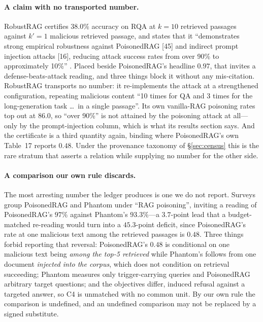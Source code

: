 \documentclass[11pt]{article}
\begin{document}
\paragraph{A claim with no transported number.}
RobustRAG certifies $38.0\%$ accuracy on RQA at $k=10$ retrieved passages
against $k'=1$ malicious retrieved passage, and states that it ``demonstrates
strong empirical robustness against PoisonedRAG [45] and indirect prompt
injection attacks [16], reducing attack success rates from over 90\% to
approximately 10\%'' \citep{certifiedRAG2024}. Placed beside PoisonedRAG's
headline $0.97$, that invites a defense-beats-attack reading, and three things
block it without any mis-citation. RobustRAG transports no number: it
re-implements the attack at a strengthened configuration, repeating malicious
content ``10 times for QA and 3 times for the long-generation task \dots\ in a
single passage''. Its own vanilla-RAG poisoning rates top out at $86.0$, so
``over 90\%'' is not attained by the poisoning attack at all---only by the
prompt-injection column, which is what its results section says. And the
certificate is a third quantity again, binding where PoisonedRAG's own Table~17
reports $0.48$. Under the provenance taxonomy of \S\ref{sec:census} this is the
rare stratum that asserts a relation while supplying no number for the other
side.

\paragraph{A comparison our own rule discards.}
\label{sec:discarded}
The most arresting number the ledger produces is one we do not report.
Surveys group PoisonedRAG and Phantom under ``RAG poisoning'', inviting a
reading of PoisonedRAG's $97\%$ against Phantom's $93.3\%$---a $3.7$-point lead
that a budget-matched re-reading would turn into a $45.3$-point deficit, since
PoisonedRAG's rate at one malicious text among the retrieved passages is $0.48$.
Three things forbid reporting that reversal: PoisonedRAG's $0.48$ is conditional
on one malicious text being \emph{among the top-5 retrieved} while Phantom's
follows from one document \emph{injected into the corpus}, which does not
condition on retrieval succeeding; Phantom measures only trigger-carrying
queries and PoisonedRAG arbitrary target questions; and the objectives differ,
induced refusal against a targeted answer, so C4 is unmatched with no common
unit. By our own rule the comparison is undefined, and an undefined comparison
may not be replaced by a signed substitute.
\end{document}
